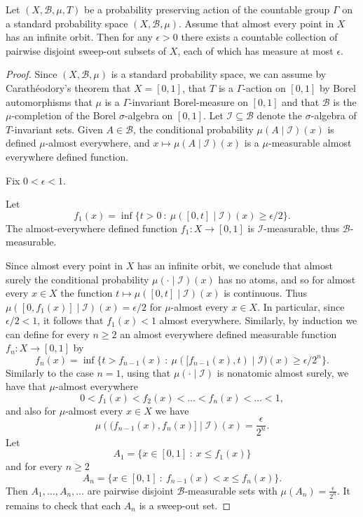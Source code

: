 \documentclass[10pt,a4paper]{amsart}
\begin{document}
\begin{lemma}\label{lem:sweep_out_partition}
    Let $(X,\mathcal{B},\mu,T)$ be a probability preserving action of the countable group $\Gamma$ on a standard  probability space $(X,\mathcal{B},\mu)$. Assume that almost every point in $X$ has an infinite orbit. 
    Then for any $\epsilon >0$ there exists a countable collection of pairwise disjoint sweep-out subsets of  $X$, each of which has measure at most $\epsilon$.
\end{lemma}

\begin{proof}
    Since $(X,\mathcal{B},\mu)$ is a standard probability space, we can assume by  Carath{\'e}odory's theorem that $X=[0,1]$,  that $T$ is a $\Gamma$-action on $[0,1]$ by Borel automorphisms that $\mu$ is a  $\Gamma$-invariant Borel-measure on $[0,1]$ and that $\mathcal{B}$ is the $\mu$-completion of the Borel $\sigma$-algebra on $[0,1]$.
    Let $\mathcal{I} \subseteq \mathcal{B}$ denote the $\sigma$-algebra of $T$-invariant sets. Given $A \in \mathcal{B}$, the conditional probability $\mu(A \mid \mathcal{I})(x)$ is defined $\mu$-almost everywhere, and $x \mapsto \mu(A \mid \mathcal{I})(x)$ is a $\mu$-measurable  almost everywhere defined function.

Fix $0 < \epsilon < 1$.

Let 
\[
f_1(x) = \inf \{ t >0~:~ \mu( [0,t] \mid \mathcal{I})(x) \ge \epsilon/2\}.
\]
The almost-everywhere defined function $f_1:X \to [0,1]$ is $\mathcal{I}$-measurable, thus $\mathcal{B}$-measurable.

Since almost every point in $X$ has an infinite orbit,  we conclude that almost surely the conditional probability $\mu(\cdot \mid \mathcal{I})(x)$ has no atoms, and so  for almost every $x \in X$ the function $t \mapsto  \mu([0,t] \mid \mathcal{I})(x)$ is continuous. Thus $\mu([0,f_1(x)] \mid \mathcal{I})(x) = \epsilon/2$ for $\mu$-almost every $x \in X$. In particular, since $\epsilon /2 < 1$, it follows that $f_1(x) < 1$ almost everywhere.
Similarly, by induction  we can define for every $n \ge 2$ an almost everywhere defined measurable function  $f_{n}:X \to [0,1]$ by
\[
f_n(x) = \inf \{ t >f_{n-1}(x) ~:~ \mu( [f_{n-1}(x),t) \mid \mathcal{I})(x) \ge \epsilon/2^n\}.
\]
Similarly to the case $n=1$, using that $\mu(
\cdot 
\mid \mathcal{I})$ is nonatomic almost surely, we have that  $\mu$-almost everywhere
\[ 0 < f_1(x) < f_2(x) < \ldots < f_n(x) < \ldots < 1,\]
and also for  $\mu$-almost every $x \in X$ we have
\[ \mu\left( (f_{n-1}(x),f_n(x)] \mid \mathcal{I}\right)(x) = \frac{\epsilon}{2^n}. \]
Let
\[
A_1 = \{ x \in [0,1]~:~ x \le f_1(x)\}
\]
and for every $n \ge 2$
\[
A_n = \{ x \in [0,1]~:~ f_{n-1}(x) < x \le f_n(x)\}.
\]
Then $A_1,\ldots,A_n,\ldots$ are pairwise disjoint $\mathcal{B}$-measurable sets with $\mu(A_n) = \frac{\epsilon}{2^n}$.
It remains to check that each $A_n$ is a sweep-out set.


\end{proof}
\end{document}
